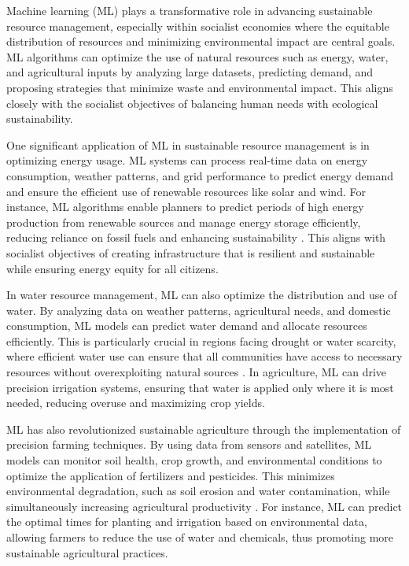 \begin{refsection}
Machine learning (ML) plays a transformative role in advancing sustainable resource management, especially within socialist economies where the equitable distribution of resources and minimizing environmental impact are central goals. ML algorithms can optimize the use of natural resources such as energy, water, and agricultural inputs by analyzing large datasets, predicting demand, and proposing strategies that minimize waste and environmental impact. This aligns closely with the socialist objectives of balancing human needs with ecological sustainability.

One significant application of ML in sustainable resource management is in optimizing energy usage. ML systems can process real-time data on energy consumption, weather patterns, and grid performance to predict energy demand and ensure the efficient use of renewable resources like solar and wind. For instance, ML algorithms enable planners to predict periods of high energy production from renewable sources and manage energy storage efficiently, reducing reliance on fossil fuels and enhancing sustainability \cite[pp.~112-115]{tapscott2016}. This aligns with socialist objectives of creating infrastructure that is resilient and sustainable while ensuring energy equity for all citizens.

In water resource management, ML can also optimize the distribution and use of water. By analyzing data on weather patterns, agricultural needs, and domestic consumption, ML models can predict water demand and allocate resources efficiently. This is particularly crucial in regions facing drought or water scarcity, where efficient water use can ensure that all communities have access to necessary resources without overexploiting natural sources \cite[pp.~78-82]{mazzucato2023}. In agriculture, ML can drive precision irrigation systems, ensuring that water is applied only where it is most needed, reducing overuse and maximizing crop yields.

ML has also revolutionized sustainable agriculture through the implementation of precision farming techniques. By using data from sensors and satellites, ML models can monitor soil health, crop growth, and environmental conditions to optimize the application of fertilizers and pesticides. This minimizes environmental degradation, such as soil erosion and water contamination, while simultaneously increasing agricultural productivity \cite[pp.~98-101]{schneider2018}. For instance, ML can predict the optimal times for planting and irrigation based on environmental data, allowing farmers to reduce the use of water and chemicals, thus promoting more sustainable agricultural practices.


\end{refsection}
